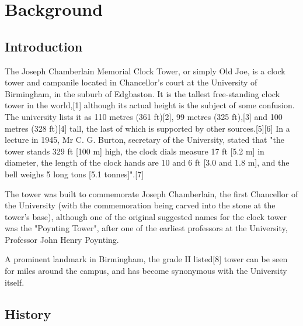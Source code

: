 \chapter{Background}

\section{Introduction}



The Joseph Chamberlain Memorial Clock Tower, or simply Old Joe, is a clock tower and campanile located in Chancellor's court at the University of Birmingham, in the suburb of Edgbaston. It is the tallest free-standing clock tower in the world,[1] although its actual height is the subject of some confusion. The university lists it as 110 metres (361 ft)[2], 99 metres (325 ft),[3] and 100 metres (328 ft)[4] tall, the last of which is supported by other sources.[5][6] In a lecture in 1945, Mr C. G. Burton, secretary of the University, stated that "the tower stands 329 ft [100 m] high, the clock dials measure 17 ft [5.2 m] in diameter, the length of the clock hands are 10 and 6 ft [3.0 and 1.8 m], and the bell weighs 5 long tons [5.1 tonnes]".[7]

The tower was built to commemorate Joseph Chamberlain, the first Chancellor of the University (with the commemoration being carved into the stone at the tower's base), although one of the original suggested names for the clock tower was the "Poynting Tower", after one of the earliest professors at the University, Professor John Henry Poynting.

A prominent landmark in Birmingham, the grade II listed[8] tower can be seen for miles around the campus, and has become synonymous with the University itself. 

\section{History}

